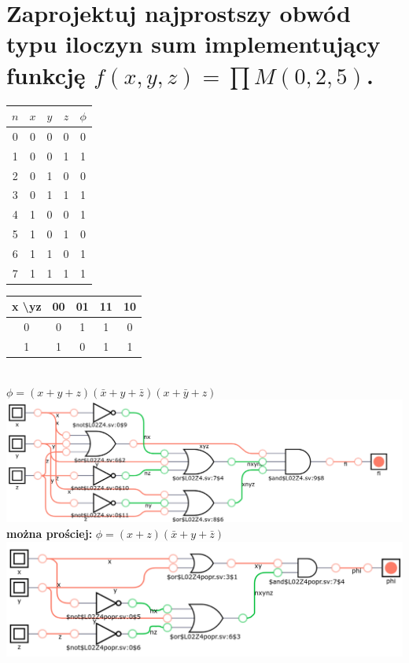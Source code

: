 \documentclass{article}
\begin{document}
\section{Zaprojektuj najprostszy obwód typu iloczyn sum implementujący funkcję $f (x, y, z) = \prod M (0, 2, 5)$.}
 \begin{center}
	\begin{tabular}{|c||c|c|c||c|} 
	 \hline
	$n$ & $x$ & $y$ & $z$ & $\phi$\\ 
	 \hline \hline
	 0&0&0&0&0\\ \hline
	 1&0&0&1&1\\ \hline
	 2&0&1&0&0\\ \hline
	 3&0&1&1&1\\ \hline
	 4&1&0&0&1\\ \hline	 
	 5&1&0&1&0\\ \hline
	 6&1&1&0&1\\ \hline
	 7&1&1&1&1\\ \hline
	\end{tabular}
	\begin{tabular}{|c|c|c|c|c|} 
	 \hline
	x \textbackslash yz& 00 & 01 & 11 & 10\\ 
	 \hline
	 0&0&1&1&0\\ \hline
	 1&1&0&1&1\\ \hline
	\end{tabular}\\
	$ \phi = (x+y+z)(\bar x +y+ \bar z)(x + \bar y + z)$\\
	\includegraphics[scale=0.3]{./L02Z04.png}
	\textbf{można prościej:}
	$ \phi = (x+z)(\bar{x} + y + \bar{z})$\\
	\includegraphics[scale=0.3]{./L02Z04popr.png}
\end{center}
\end{document}
